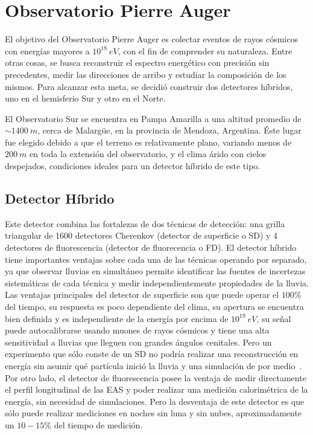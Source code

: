 \chapter{\label{cap:detector} Observatorio Pierre Auger}

El objetivo del Observatorio Pierre Auger es colectar eventos de rayos c\'osmicos con energ\'ias mayores a $10^{18}\ eV$, con el fin de comprender su naturaleza. Entre otras cosas, se busca reconstruir el espectro energ\'etico con precisi\'on sin precedentes, medir las direcciones de arribo y estudiar la composici\'on de los mismos.
Para alcanzar esta meta, se decidi\'o construir dos detectores h\'ibridos, uno en el hemisferio Sur y otro en el Norte.

El Observatorio Sur se encuentra en Pampa Amarilla a una altitud promedio de $\sim 1400\ m$, cerca de Malarg\"ue, en la provincia de Mendoza, Argentina.
\'Este lugar fue elegido debido a que el terreno es relativamente plano, variando menos de $200\ m$ en toda la extensi\'on del observatorio, y el clima \'arido con cielos despejados, condiciones ideales para un detector h\'ibrido de este tipo.

	\section{Detector H\'ibrido}
	Este detector combina las fortalezas de dos t\'ecnicas de detecci\'on: una grilla triangular de 1600 detectores Cherenkov (detector de superficie o SD) y 4 detectores de fluorescencia (detector de fluorecencia o FD).
	El detector h\'ibrido tiene importantes ventajas sobre cada una de las t\'ecnicas operando por separado, ya que observar lluvias en simult\'aneo permite identificar las fuentes de incertezas sistem\'aticas de cada t\'ecnica y medir independientemente propiedades de la lluvia.
	Las ventajas principales del detector de superficie son que puede operar el $100 \%$ del tiempo, su respuesta es poco dependiente del clima, su apertura se encuentra bien definida y es independiente de la energ\'ia por encima de $10^{19}\ eV$, su se\~nal puede autocalibrarse usando muones de rayos c\'osmicos  y tiene una alta sensitividad a lluvias que lleguen con grandes \'angulos cenitales. 
	Pero un experimento que s\'olo conste de un SD no podr\'ia realizar una reconstrucci\'on en energ\'ia sin asumir qu\'e part\'icula inici\'o la lluvia y una simulaci\'on de por medio~\cite{busca_thesis}.
	Por otro lado, el detector de fluorescencia posee la ventaja de medir directamente el perfil longitudinal de las EAS y poder realizar una medici\'on calorim\'etrica de la energ\'ia, sin necesidad de simulaciones. Pero la desventaja de este detector es que s\'olo puede realizar mediciones en noches sin luna y sin nubes, aproximadamente un $10 - 15 \%$ del tiempo de medici\'on.
	
